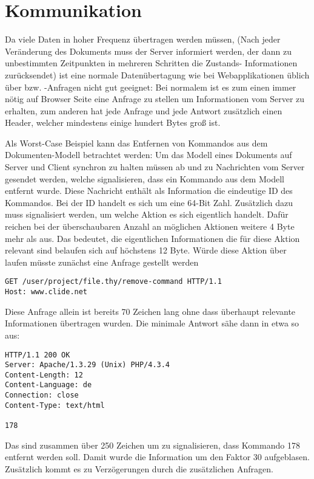 \section{Kommunikation}

Da viele Daten in hoher Frequenz übertragen werden müssen, (Nach jeder Veränderung des Dokuments
muss der Server informiert werden, der dann zu unbestimmten Zeitpunkten in mehreren Schritten die
Zustands- Informationen zurücksendet) ist eine normale Datenübertagung wie bei Webapplikationen
üblich über  bzw. -Anfragen nicht gut geeignet: Bei normalem  ist es
zum einen immer nötig auf Browser Seite eine Anfrage zu stellen um Informationen vom Server zu
erhalten, zum anderen hat jede Anfrage und jede Antwort zusätzlich einen Header, welcher mindestens
einige hundert Bytes groß ist. 

Als Worst-Case Beispiel kann das Entfernen von Kommandos aus dem Dokumenten-Modell betrachtet
werden: Um das Modell eines Dokuments auf Server und Client synchron zu halten müssen ab und zu
Nachrichten vom Server gesendet werden, welche signalisieren, dass ein Kommando aus dem Modell
entfernt wurde. Diese Nachricht enthält als Information die eindeutige ID des Kommandos. Bei der ID
handelt es sich um eine 64-Bit Zahl. Zusätzlich dazu muss signalisiert werden, um welche Aktion es
sich eigentlich handelt. Dafür reichen bei der überschaubaren Anzahl an möglichen Aktionen weitere 4
Byte mehr als aus. Das bedeutet, die eigentlichen Informationen die für diese Aktion relevant sind
belaufen sich auf höchstens 12 Byte. Würde diese Aktion über  laufen müsste zunächst eine
Anfrage gestellt werden

\begin{lstlisting}
GET /user/project/file.thy/remove-command HTTP/1.1
Host: www.clide.net
\end{lstlisting}

Diese Anfrage allein ist bereits 70 Zeichen lang ohne dass überhaupt relevante Informationen
übertragen wurden. Die minimale Antwort sähe dann in etwa so aus:

\begin{lstlisting}
HTTP/1.1 200 OK
Server: Apache/1.3.29 (Unix) PHP/4.3.4
Content-Length: 12
Content-Language: de
Connection: close
Content-Type: text/html

178
\end{lstlisting}

Das sind zusammen über 250 Zeichen um zu signalisieren, dass Kommando 178 entfernt werden soll.
Damit wurde die Information um den Faktor 30 aufgeblasen. Zusätzlich kommt es zu Verzögerungen durch
die zusätzlichen Anfragen. 

